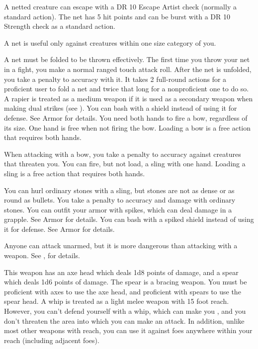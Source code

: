 \par A netted creature can escape with a DR 10 Escape Artist check (normally a standard action). The net has 5 hit points and can be burst with a DR 10 Strength check as a standard action.
\par A net is useful only against creatures within one size category of you.
\par A net must be folded to be thrown effectively. The first time you throw your net in a fight, you make a normal ranged touch attack roll. After the net is unfolded, you take a  penalty to accuracy with it. It takes 2 full-round actions for a proficient user to fold a net and twice that long for a nonproficient one to do so.
 A rapier is treated as a medium weapon if it is used as a secondary weapon when making dual strikes (see ).
 You can bash with a shield instead of using it for defense. See Armor for details.
 You need both hands to fire a bow, regardless of its size. One hand is free when not firing the bow. Loading a bow is a free action that requires both hands.
\par When attacking with a bow, you take a  penalty to accuracy against creatures that threaten you.
 You can fire, but not load, a sling with one hand. Loading a sling is a free action that requires both hands.
\par You can hurl ordinary stones with a sling, but stones are not as dense or as round as bullets. You take a  penalty to accuracy and damage with ordinary stones.
 You can outfit your armor with spikes, which can deal damage in a grapple. See Armor for details.
 You can bash with a spiked shield instead of using it for defense. See Armor for details.

 Anyone can attack unarmed, but it is more dangerous than attacking with a weapon. See , for details.

 This weapon has an axe head which deals 1d8 points of damage, and a spear which deals 1d6 points of damage. The spear is a bracing weapon. You must be proficient with axes to use the axe head, and proficient with spears to use the spear head.
 A whip is treated as a light melee weapon with 15 foot reach. However, you can't defend yourself with a whip, which can make you , and you don't threaten the area into which you can make an attack. In addition, unlike most other weapons with reach, you can use it against foes anywhere within your reach (including adjacent foes).

